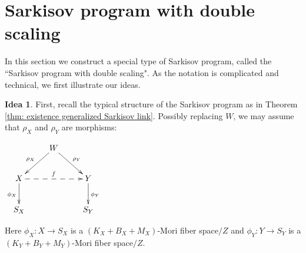 \documentclass[11pt]{amsart}
\numberwithin{equation}{section}
\theoremstyle{definition}
\newtheorem{idea}[thm]{Idea}
\theoremstyle{remark}
\theoremstyle{definition}
\begin{document}
\section{Sarkisov program with double scaling}

In this section we construct a special type of Sarkisov program, called the ``Sarkisov program with double scaling". As the notation is complicated and technical, we first illustrate our ideas.

\begin{idea}\label{idea: sarkisov scaling}
First, recall the typical structure of the Sarkisov program as in Theorem \ref{thm: existence generalized Sarkisov link}. Possibly replacing $W$, we may assume that $\rho_X$ and $\rho_Y$ are morphisms:
\begin{center}$\xymatrix{
 & W\ar@{->}[dl]_{\rho_X}\ar@{->}[dr]^{\rho_Y}& \\
      X \ar@{->}[d]_{\phi_X}\ar@{-->}[rr]^{f}   &  & Y\ar@{->}[d]^{\phi_Y} \\
    S_X & &S_Y }$
\end{center}
Here $\phi_X: X\rightarrow S_X$ is a $(K_X+B_X+M_X)$-Mori fiber space$/Z$ and $\phi_Y: Y\rightarrow S_Y$ is a $(K_Y+B_Y+M_Y)$-Mori fiber space$/Z$. 


\end{idea}
\end{document}
